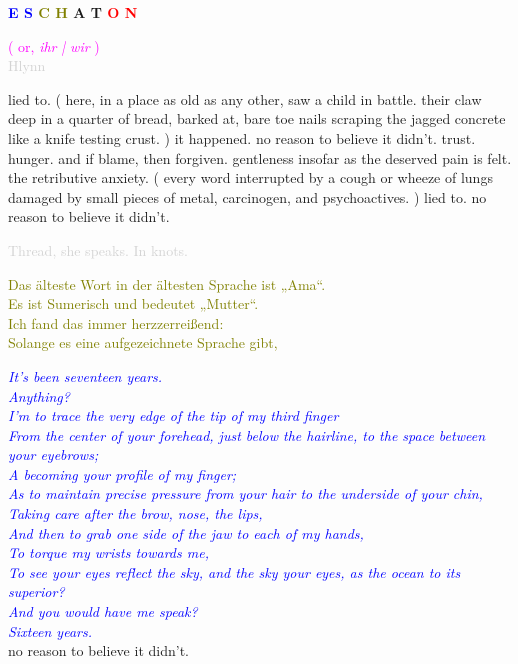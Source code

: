 \documentclass[11pt]{article}
\begin{document}
\begingroup
\begin{center}
\huge \textbf{\textcolor{blue}{E S} \textcolor{olive}{C H} A T \textcolor{red}{O N}}
\end{center}
\endgroup

\begingroup
\begin{center}
\textcolor{magenta}{( or, \textit{ihr} \textit{| wir} )} \\ \textcolor{lightgray}{Hlynn}
\end{center}
\endgroup

\vspace*{2\baselineskip}

\begingroup
lied to. ( here, in a place as old as any other, saw a child in battle. their claw deep in a quarter of bread, barked at, bare toe nails scraping the jagged concrete like a knife testing crust. ) it happened. no reason to believe it didn't. trust. hunger. and if blame, then forgiven. gentleness insofar as the deserved pain is felt. the retributive anxiety. ( every word interrupted by a cough or wheeze of lungs damaged by small pieces of metal, carcinogen, and psychoactives. ) lied to. no reason to believe it didn't.
\endgroup

\begingroup
\begin{center}
\textcolor{lightgray}{Thread, she speaks. In knots.}
\rightskip\leftskip
\end{center}
\endgroup

\begingroup
\begin{center}
\textcolor{olive}{Das älteste Wort in der ältesten Sprache ist „Ama“. \\ Es ist Sumerisch und bedeutet „Mutter“. \\ Ich fand das immer herzzerreißend: \\ Solange es eine aufgezeichnete Sprache gibt,}
\end{center}
\endgroup

\begingroup
\begin{center}
\textit{\textcolor{blue}{It's been seventeen years. \\ Anything? \\ I'm to trace the very edge of the tip of my third finger \\ From the center of your forehead, just below the hairline, to the space between your eyebrows; \\ A becoming your profile of my finger; \\ As to maintain precise pressure from your hair to the underside of your chin, \\ Taking care after the brow, nose, the lips, \\ And then to grab one side of the jaw to each of my hands, \\ To torque my wrists towards me, \\ To see your eyes reflect the sky, and the sky your eyes, as the ocean to its superior? \\ And you would have me speak? \\ Sixteen years. } } \\ no reason to believe it didn't. 
\end{center}
\endgroup
\end{document}
